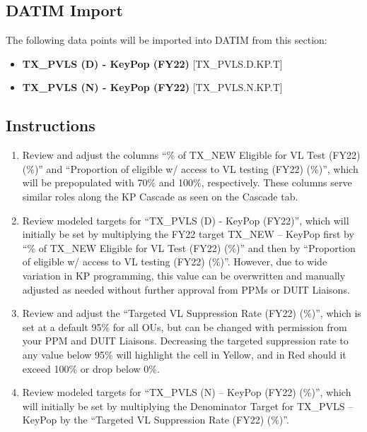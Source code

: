 \documentclass[
  openany]{book}
\begin{document}
\hypertarget{datim-import-49}{%
\subsection{DATIM Import}\label{datim-import-49}}

The following data points will be imported into DATIM from this section:

\begin{itemize}
\item
  \textbf{TX\_PVLS (D) - KeyPop (FY22)} {[}TX\_PVLS.D.KP.T{]}
\item
  \textbf{TX\_PVLS (N) - KeyPop (FY22)} {[}TX\_PVLS.N.KP.T{]}
\end{itemize}

\hypertarget{instructions-49}{%
\subsection{Instructions}\label{instructions-49}}

\begin{enumerate}
\def\labelenumi{\arabic{enumi}.}
\item
  Review and adjust the columns ``\% of TX\_NEW Eligible for VL Test
  (FY22) (\%)'' and ``Proportion of eligible w/ access to VL testing
  (FY22) (\%)'', which will be prepopulated with 70\% and 100\%,
  respectively. These columns serve similar roles along the KP Cascade
  as seen on the Cascade tab.
\item
  Review modeled targets for ``TX\_PVLS (D) - KeyPop (FY22)'', which will
  initially be set by multiplying the FY22 target TX\_NEW -- KeyPop
  first by ``\% of TX\_NEW Eligible for VL Test (FY22) (\%)'' and then by
  ``Proportion of eligible w/ access to VL testing (FY22) (\%)''.
  However, due to wide variation in KP programming, this value can be
  overwritten and manually adjusted as needed without further approval
  from PPMs or DUIT Liaisons.
\item
  Review and adjust the ``Targeted VL Suppression Rate (FY22) (\%)'',
  which is set at a default 95\% for all OUs, but can be changed with
  permission from your PPM and DUIT Liaisons. Decreasing the targeted
  suppression rate to any value below 95\% will highlight the cell in
  Yellow, and in Red should it exceed 100\% or drop below 0\%.
\item
  Review modeled targets for ``TX\_PVLS (N) -- KeyPop (FY22) (\%)'', which
  will initially be set by multiplying the Denominator Target for
  TX\_PVLS -- KeyPop by the ``Targeted VL Suppression Rate (FY22) (\%)''.
\end{enumerate}
\end{document}
